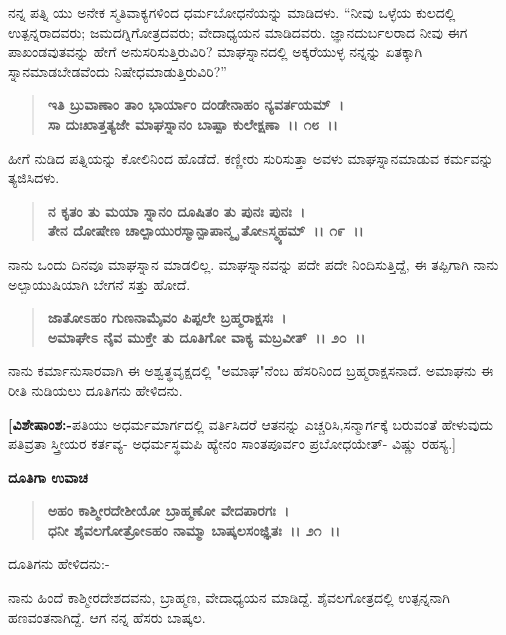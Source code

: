 ನನ್ನ ಪತ್ನಿ ಯು ಅನೇಕ ಸ್ಮತಿವಾಕ್ಯಗಳಿಂದ ಧರ್ಮಬೋಧನೆಯನ್ನು ಮಾಡಿದಳು. “ನೀವು ಒಳ್ಳೆಯ ಕುಲದಲ್ಲಿ ಉತ್ಪನ್ನರಾದವರು; ಜಮದಗ್ನಿಗೋತ್ರದವರು; ವೇದಾಧ್ಯಯನ ಮಾಡಿದವರು. ಜ್ಞಾನದುರ್ಬಲರಾದ ನೀವು ಈಗ ಪಾಖಂಡವುತವನ್ನು ಹೇಗೆ ಅನುಸರಿಸುತ್ತಿರುವಿರಿ? ಮಾಘಸ್ನಾನದಲ್ಲಿ ಅಕ್ಕರೆಯುಳ್ಳ ನನ್ನನ್ನು ಏತಕ್ಕಾಗಿ ಸ್ನಾನಮಾಡಬೇಡವೆಂದು ನಿಷೇಧಮಾಡುತ್ತಿರುವಿರಿ?”

\begin{verse}
\textbf{ಇತಿ ಬ್ರುವಾಣಾಂ ತಾಂ ಭಾರ್ಯಾಂ ದಂಡೇನಾಹಂ ನ್ಯವರ್ತಯಮ್~।}\\\textbf{ಸಾ ದುಃಖಾತ್ತತ್ಯಜೇ ಮಾಘಸ್ನಾನಂ ಬಾಷ್ಪಾ ಕುಲೇಕ್ಷಣಾ~।। ೧೮~।।}
\end{verse}

ಹೀಗೆ ನುಡಿದ ಪತ್ನಿಯನ್ನು ಕೋಲಿನಿಂದ ಹೊಡೆದೆ. ಕಣ್ಣೀರು ಸುರಿಸುತ್ತಾ ಅವಳು ಮಾಘಸ್ನಾನಮಾಡುವ ಕರ್ಮವನ್ನು ತ್ಯಜಿಸಿದಳು.

\begin{verse}
\textbf{ನ ಕೃತಂ ತು ಮಯಾ ಸ್ನಾನಂ ದೂಷಿತಂ ತು ಪುನಃ ಪುನಃ~।}\\\textbf{ತೇನ ದೋಷೇಣ ಚಾಲ್ಪಾಯುರಸ್ಮಾನ್ಪಾಪಾನ್ಮೃ ತೋsಸ್ಮ್ಯಹಮ್~।। ೧೯~।।}
\end{verse}

ನಾನು ಒಂದು ದಿನವೂ ಮಾಘಸ್ನಾನ ಮಾಡಲಿಲ್ಲ. ಮಾಘಸ್ನಾನವನ್ನು ಪದೇ ಪದೇ ನಿಂದಿಸುತ್ತಿದ್ದೆ, ಈ ತಪ್ಪಿಗಾಗಿ ನಾನು ಅಲ್ಪಾಯುಷಿಯಾಗಿ ಬೇಗನೆ ಸತ್ತು ಹೋದೆ.

\begin{verse}
\textbf{ಜಾತೋಽಹಂ ಗುಣನಾಮೈವಂ ಪಿಪ್ಪಲೇ ಬ್ರಹ್ಮರಾಕ್ಷಸಃ~।}\\\textbf{ಅಮಾಘೇಽ ನೈವ ಮುಕ್ತೇ ತು ದೂತಿಗೋ ವಾಕ್ಯ ಮಬ್ರವೀತ್~।। ೨೦~।।}
\end{verse}

ನಾನು ಕರ್ಮಾನುಸಾರವಾಗಿ ಈ ಅಶ್ವತ್ಥವೃಕ್ಷದಲ್ಲಿ "ಅಮಾಘ"ನೆಂಬ ಹೆಸರಿನಿಂದ ಬ್ರಹ್ಮರಾಕ್ಷಸನಾದೆ. ಅಮಾಘನು ಈ ರೀತಿ ನುಡಿಯಲು ದೂತಿಗನು ಹೇಳಿದನು.

\textbf{[ವಿಶೇಷಾಂಶ:-}ಪತಿಯು ಅಧರ್ಮಮಾರ್ಗದಲ್ಲಿ ವರ್ತಿಸಿದರೆ ಆತನನ್ನು ಎಚ್ಚರಿಸಿ,\break ಸನ್ಮಾರ್ಗಕ್ಕೆ ಬರುವಂತೆ ಹೇಳುವುದು ಪತಿವ್ರತಾ ಸ್ತ್ರೀಯರ ಕರ್ತವ್ಯ- ಅಧರ್ಮಸ್ಥಮಪಿ ಹ್ಯೇನಂ ಸಾಂತಪೂರ್ವಂ ಪ್ರಬೋಧಯೇತ್- ವಿಷ್ಣು ರಹಸ್ಯ.]

\begin{flushleft}
\textbf{ದೂತಿಗಾ ಉವಾಚ\enginline{-}}
\end{flushleft}

\begin{verse}
\textbf{ಅಹಂ ಕಾಶ್ಮೀರದೇಶೀಯೋ ಬ್ರಾಹ್ಮಣೋ ವೇದಪಾರಗಃ~।}\\\textbf{ಧನೀ ಶೈವಲಗೋತ್ರೋಽಹಂ ನಾಮ್ಮಾ ಬಾಷ್ಕಲಸಂಜ್ಞಿತಃ~।। ೨೧~।। }
\end{verse}

\begin{flushleft}
ದೂತಿಗನು ಹೇಳಿದನು:-
\end{flushleft}

ನಾನು ಹಿಂದೆ ಕಾಶ್ಮೀರದೇಶದವನು, ಬ್ರಾಹ್ಮಣ, ವೇದಾಧ್ಯಯನ ಮಾಡಿದ್ದೆ. ಶೈವಲಗೋತ್ರದಲ್ಲಿ ಉತ್ಪನ್ನನಾಗಿ ಹಣವಂತನಾಗಿದ್ದೆ. ಆಗ ನನ್ನ ಹೆಸರು ಬಾಷ್ಕಲ.

